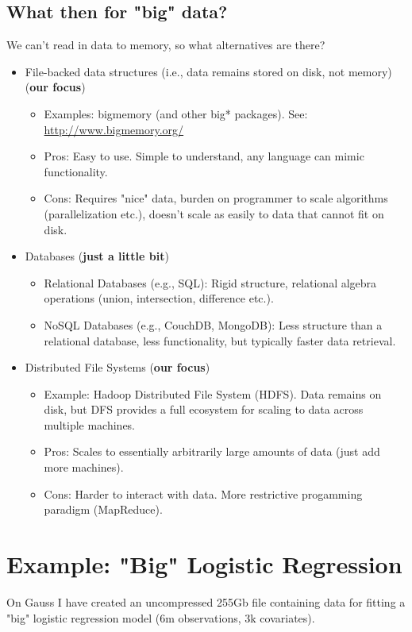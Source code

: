\documentclass[11pt]{article}
\begin{document}
\subsection{What then for "big" data?}
We can't read in data to memory, so what alternatives are there?
\begin{itemize}
  \item File-backed data structures (i.e., data remains stored on disk, not memory) (\textbf{our focus})
      \begin{itemize}
        \item Examples: bigmemory (and other big* packages). See: \href{http://www.bigmemory.org/}{http://www.bigmemory.org/}
        \item Pros: Easy to use. Simple to understand, any language can mimic functionality.
        \item Cons: Requires "nice" data, burden on programmer to scale algorithms (parallelization etc.), doesn't scale as easily to data that cannot fit on disk.
      \end{itemize}
  \item Databases (\textbf{just a little bit})
      \begin{itemize}
        \item Relational Databases (e.g., SQL): Rigid structure, relational algebra operations (union, intersection, difference etc.).
        \item NoSQL Databases (e.g., CouchDB, MongoDB): Less structure than a relational database, less functionality, but typically faster data retrieval.
      \end{itemize}
  \item Distributed File Systems (\textbf{our focus})
      \begin{itemize}
        \item Example: Hadoop Distributed File System (HDFS). Data remains on disk, but DFS provides a full ecosystem for scaling to data across multiple machines.
        \item Pros: Scales to essentially arbitrarily large amounts of data (just add more machines).
        \item Cons: Harder to interact with data. More restrictive progamming paradigm (MapReduce).
      \end{itemize}
\end{itemize}
\section{Example: "Big" Logistic Regression}
On Gauss I have created an uncompressed 255Gb file containing data for fitting a "big" logistic regression model (6m observations, 3k covariates).
\end{document}
